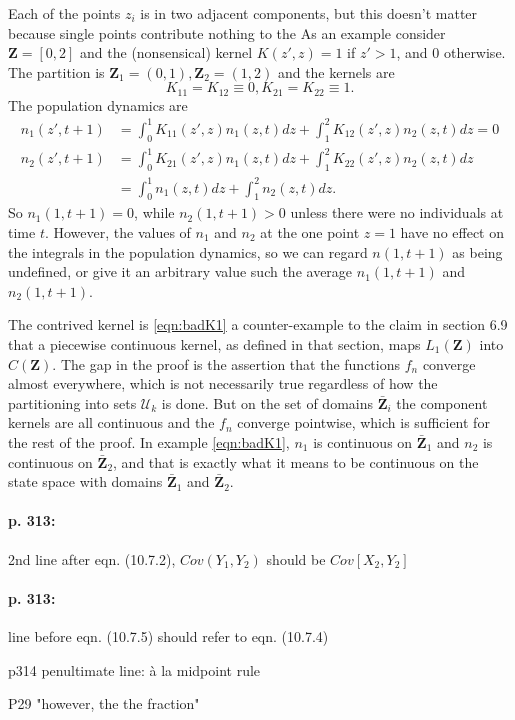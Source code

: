 \documentclass[12pt]{article}
\numberwithin{Box}{section}
\def\Z{\mathbf{Z}}
\newcommand{\be}{\begin{equation}}
\newcommand{\ee}{\end{equation}}
\newcommand{\ba}{\begin{equation} \begin{aligned}}
\newcommand{\ea}{\end{aligned} \end{equation}}
\begin{document}
Each of the points $z_i$ is in two adjacent components, but this doesn't matter because  
single points contribute nothing to the 
As an example consider  $\Z = [0,2]$ and the (nonsensical) kernel $K(z',z) = 1$ 
if $z'>1$, and 0 otherwise. The partition is $\Z_1 = (0,1), \Z_2 = (1,2)$ and the kernels are 
\be
K_{11}=K_{12}\equiv 0, K_{21}=K_{22}\equiv 1.
\ee
The population dynamics are 
\ba
n_1(z',t+1) & = \int_0^1 K_{11}(z',z) n_1(z,t) dz + \int_1^2 K_{12}(z',z) n_2(z,t) dz  = 0 \\
n_2(z',t+1) & = \int_0^1 K_{21}(z',z) n_1(z,t) dz + \int_1^2 K_{22}(z',z) n_2(z,t) dz  \\
& =  \int_0^1 n_1(z,t) dz + \int_1^2 n_2(z,t) dz.  
\label{eqn:badK1}
\ea
So $n_1(1,t+1)=0$, while $n_2(1,t+1)>0$ unless there were no individuals at time $t$. 
However, the values of $n_1$ and $n_2$ at the one point $z=1$ have no effect on the
integrals in the population dynamics, so we can regard $n(1,t+1)$ as being undefined,
or give it an arbitrary value such the average $n_1(1,t+1)$ and $n_2(1,t+1)$. 

The contrived kernel is \eqref{eqn:badK1} a counter-example to the claim in section 6.9 that a 
piecewise continuous kernel, as defined in that section, maps $L_1(\Z)$ into $C(\Z)$. 
The gap in the proof is the assertion that the functions $f_n$ converge almost everywhere, 
which is not necessarily true regardless of how the partitioning into sets $\mathcal{U}_k$ is done. But on the 
set of domains $\bar{\Z}_{i}$ the component kernels are all continuous and the $f_n$ converge 
pointwise, which is sufficient for the rest of the proof. 
In example \eqref{eqn:badK1}, $n_1$ is continuous on $\bar{\Z}_1$ and 
$n_2$ is continuous on $\bar{\Z}_2$, and that is exactly what it means to be continuous
on the state space with domains $\bar{\Z}_1$ and $\bar{\Z}_2$.  


\paragraph{p. 313:} 2nd line after eqn. (10.7.2), $Cov(Y_1,Y_2)$ should be $Cov[X_2,Y_2]$

\paragraph{p. 313:} line before eqn. (10.7.5) should refer to eqn. (10.7.4)

p314 penultimate line:  à la midpoint rule

P29 "however, the the fraction"
\end{document}
